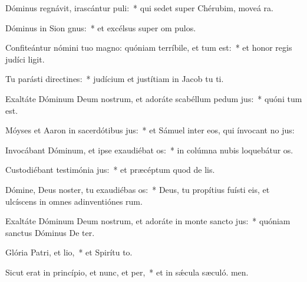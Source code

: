 \item Dóminus regnávit, irascántur puli:~* qui sedet super Chérubim, moveá ra.
\item Dóminus in Sion gnus:~* et excélsus super om pulos.
\item Confiteántur nómini tuo magno: quóniam terríbile, et tum est:~* et honor regis judíci ligit.
\item Tu parásti directines:~* judícium et justítiam in Jacob tu ti.
\item Exaltáte Dóminum Deum nostrum, et adoráte scabéllum pedum jus:~* quóni tum est.
\item Móyses et Aaron in sacerdótibus jus:~* et Sámuel inter eos, qui ínvocant no jus:
\item Invocábant Dóminum, et ipse exaudiébat os:~* in colúmna nubis loquebátur  os.
\item Custodiébant testimónia jus:~* et præcéptum quod de lis.
\item Dómine, Deus noster, tu exaudiébas os:~* Deus, tu propítius fuísti eis, et ulcíscens in omnes adinventiónes rum.
\item Exaltáte Dóminum Deum nostrum, et adoráte in monte sancto jus:~* quóniam sanctus Dóminus De ter.
\item Glória Patri, et lio,~* et Spirítu to.
\item Sicut erat in princípio, et nunc, et per,~* et in sǽcula sæculó. men.
